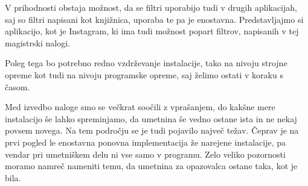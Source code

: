 \documentclass[a4paper, 12pt]{book}
\begin{document}
V prihodnosti obstaja možnost, da se filtri uporabijo tudi v drugih
aplikacijah, saj so filtri napisani kot knjižnica, uporaba te pa je
enostavna. Predstavljajmo si aplikacijo, kot je Instagram, ki ima tudi
možnost popart filtrov, napisanih v tej magistrski nalogi.

Poleg tega bo potrebno redno vzdrževanje instalacije, tako na
nivoju strojne opreme kot tudi na nivoju programske opreme, saj želimo ostati
v koraku s časom.

Med izvedbo naloge smo se večkrat soočili z vprašanjem, do kakšne mere
instalacijo še lahko spreminjamo, da umetnina še vedno ostane ista in ne nekaj
povsem novega. Na tem področju se je tudi pojavilo največ težav. Čeprav je na
prvi pogled le enostavna ponovna implementacija že narejene instalacije, pa
vendar pri umetniškem delu ni vse samo v programu. Zelo veliko pozornosti
moramo namreč nameniti temu, da umetnina za opazovalca ostane taka, kot je
bila.










\backmatter
\end{document}
